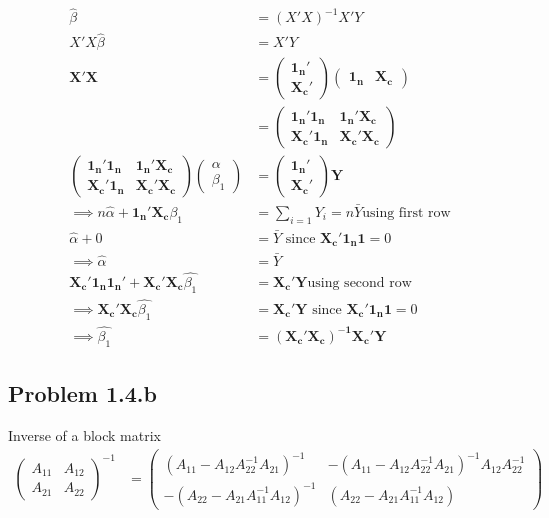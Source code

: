 \documentclass[a4paper]{article}
\begin{document}
\begin{align*}
\hat{\beta} &= (X'X)^{-1}X'Y\\
X'X\hat{\beta} &= X'Y\\ 
\mathbf{X'X} &= \begin{pmatrix}
\mathbf{1_n}'\\
\mathbf{X_c}'
\end{pmatrix} \begin{pmatrix}
\mathbf{1_n} & \mathbf{X_c}
\end{pmatrix}\\
&= \begin{pmatrix}
\mathbf{1_n}' \mathbf{1_n} & \mathbf{1_n'X_c}\\
\mathbf{X_c'1_n} & \mathbf{X_c'X_c}
\end{pmatrix}\\
\begin{pmatrix}
\mathbf{1_n}' \mathbf{1_n} & \mathbf{1_n'X_c}\\
\mathbf{X_c'1_n} & \mathbf{X_c'X_c}
\end{pmatrix} \begin{pmatrix}
\alpha\\
\beta_1
\end{pmatrix} &= \begin{pmatrix}
\mathbf{1_n'}\\
\mathbf{X_c'}
\end{pmatrix}\mathbf{Y}\\
\implies n\hat{\alpha} + \mathbf{1_n'X_c}\beta_1 &= \sum_{i=1}Y_i = n\bar{Y} \text{using first row}\\
\hat{\alpha} + 0 &= \bar{Y} \text{ since }\mathbf{X_c'1_n1} =0 \\
\implies \hat{\alpha} &= \bar{Y}\\
\mathbf{X_c'1_n1_n'} + \mathbf{X_c'X_c}\hat{\beta_1} &= \mathbf{X_c'Y} \text{using second row}\\
\implies \mathbf{X_c'X_c}\hat{\beta_1} &= \mathbf{X_c'Y} \text{ since }\mathbf{X_c'1_n1} =0\\
\implies \hat{\beta_1} &= \mathbf{(X_c'X_c)^{-1}X_c'Y}
\end{align*}


\subsection*{Problem 1.4.b}
Inverse of a block matrix
\begin{align*}
\begin{pmatrix}
A_{11} & A_{12}\\
A_{21} & A_{22}
\end{pmatrix}^{-1} &= \begin{pmatrix}
(A_{11}-A_{12}A_{22}^{-1}A_{21})^{-1} & -(A_{11}-A_{12}A_{22}^{-1}A_{21})^{-1}A_{12}A_{22}^{-1}\\
-(A_{22}-A_{21}A_{11}^{-1}A_{12})^{-1} & (A_{22}-A_{21}A_{11}^{-1}A_{12})
\end{pmatrix}
\end{align*}
\end{document}
